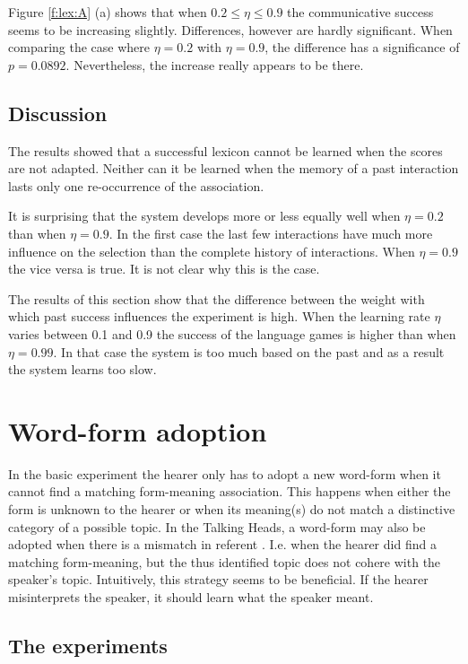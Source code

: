  Figure \ref{f:lex:A} (a) shows that  when $0.2 \leq \eta \leq 0.9$ the communicative success seems to be increasing slightly. Differences, however are hardly significant. When comparing the case where $\eta=0.2$ with $\eta=0.9$, the difference has a significance of $p=0.0892$. Nevertheless, the increase really appears to be there. 

\subsection{Discussion}

The results showed that a successful lexicon cannot be learned when the scores are not adapted. Neither can it be learned when the memory of a past interaction lasts only one re-occurrence of the association.

It is surprising that the system develops more or less equally well when $\eta=0.2$ than when $\eta=0.9$. In the first case the last few interactions have much more influence on the selection than the complete history of interactions. When $\eta=0.9$ the vice versa is true. It is not clear why this is the case.


The results of this section show that the difference between the weight with which past success influences the experiment is high. When the learning rate $\eta$ varies between 0.1 and 0.9 the success of the language games is higher than when $\eta=0.99$. In that case the system is too much based on the past and as a result the system learns too slow.


\section{Word-form adoption}\label{s:par:adopt}

In the basic experiment the hearer only has to adopt a new word-form when it cannot find a matching form-meaning association. This happens when either the form is unknown to the hearer or when its meaning(s) do not match a distinctive category of a possible topic. In the Talking Heads, a word-form may also be adopted when there is a mismatch in referent \citep{steels:2000}. I.e. when the hearer did find a matching form-meaning, but the thus identified topic does not cohere with the speaker's topic. Intuitively, this strategy seems to be beneficial. If the hearer misinterprets the speaker, it should learn what the speaker meant.

\subsection{The experiments}

